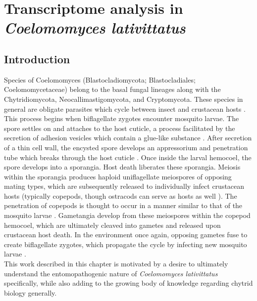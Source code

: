 ﻿%
\chapter{Transcriptome analysis in \textit{Coelomomyces lativittatus}}
\label{chap:ClatTranscriptome}
\section{Introduction}
Species of Coelomomyces (Blastocladiomycota; Blastocladiales; Coelomomycetaceae) belong to the basal fungal lineages along with the Chytridiomycota, Neocallimastigomycota, and Cryptomycota. These species in general are obligate parasites which cycle between insect and crustacean hosts \cite{Whisler1975}. This process begins when biflagellate zygotes encounter mosquito larvae. The spore settles on and attaches to the host cuticle, a process facilitated by the secretion of adhesion vesicles which contain a glue-like substance \cite{Travland1979}. After secretion of a thin cell wall, the encysted spore develops an appressorium and penetration tube which breaks through the host cuticle \cite{Zebold1979}. Once inside the larval hemocoel, the spore develops into a sporangia. Host death liberates these sporangia. Meiosis within the sporangia produces haploid uniflagellate meiospores of opposing mating types, which are subsequently released to individually infect crustacean hosts (typically copepods, though ostracods can serve as hosts as well \cite{Whisler2009}). The penetration of copepods is thought to occur in a manner similar to that of the mosquito larvae \cite{Zebold1979}. Gametangia develop from these meiospores within the copepod hemocoel, which are ultimately cleaved into gametes and released upon crustacean host death. In the environment once again, opposing gametes fuse to create biflagellate zygotes, which propagate the cycle by infecting new mosquito larvae \cite{Whisler1975}.\\
\indent This work described in this chapter is motivated by a desire to ultimately understand the entomopathogenic nature of \textit{Coelomomyces lativittatus} specifically, while also adding to the growing body of knowledge regarding chytrid biology generally. \\

